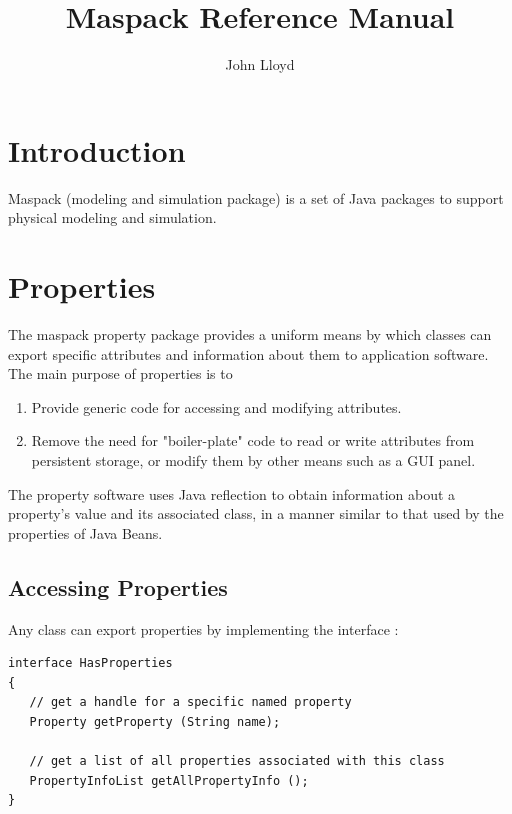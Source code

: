 \documentclass{article}
\title{Maspack Reference Manual}
\author{John Lloyd}
\date{}
\begin{document}
\maketitle

\iflatexml{\large\pubdate}\fi

\tableofcontents

\section{Introduction}

Maspack (modeling and simulation package) is a set of Java packages to
support physical modeling and simulation.

\section{Properties}
\label{properties:sec}

The maspack property package provides a uniform means by which classes
can export specific attributes and information about them to
application software.  The main purpose of properties is to

\begin{enumerate}

\item Provide generic code for accessing and modifying attributes. 

\item Remove the need for "boiler-plate" code to read or write attributes
from persistent storage, or modify them by other means such as a GUI
panel.

\end{enumerate}

The property software uses Java reflection to obtain information about
a property's value and its associated class, in a manner similar to
that used by the properties of Java Beans.

\subsection{Accessing Properties}


Any class can export properties by implementing the
interface :

\begin{lstlisting}[]
interface HasProperties
{
   // get a handle for a specific named property
   Property getProperty (String name);

   // get a list of all properties associated with this class
   PropertyInfoList getAllPropertyInfo ();
}
\end{lstlisting}
\end{document}
